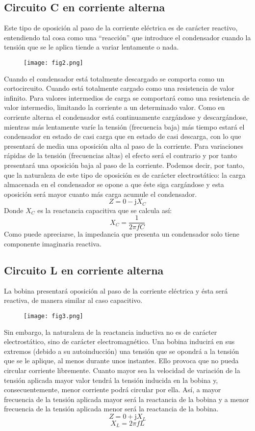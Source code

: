 \documentclass[a4paper,12pt]{report}
\begin{document}
\subsection{Circuito C en corriente alterna}
Este tipo de oposición al paso de la corriente eléctrica es de carácter reactivo, entendiendo tal cosa como una ``reacción''  que  introduce  el  condensador  cuando  la  tensión  que  se  le  aplica  tiende  a  variar  lentamente  o  nada. 
\begin{figure}[H]
\centering
\texttt{[image: fig2.png]}
\end{figure}
Cuando el condensador está totalmente descargado se comporta como un cortocircuito. Cuando está totalmente cargado  como  una  resistencia  de  valor  infinito.  Para  valores  intermedios  de  carga  se  comportará  como  una  resistencia  de  valor  intermedio,  limitando  la  corriente  a  un  determinado  valor.  Como  en  corriente  alterna  el  condensador  está  continuamente  cargándose  y  descargándose,  mientras  más  lentamente  varíe  la  tensión  (frecuencia baja) más tiempo estará el condensador en estado de casi carga que en estado de casi descarga, con lo que  presentará  de  media  una  oposición  alta  al  paso  de  la  corriente.  Para  variaciones  rápidas  de  la  tensión  (frecuencias  altas)  el  efecto  será  el  contrario  y  por  tanto  presentará  una  oposición  baja  al  paso  de  la  corriente.  Podemos  decir,  por  tanto,  que  la  naturaleza  de  este  tipo  de  oposición  es  de  carácter  electrostático:  la  carga  almacenada en el condensador se opone a que éste siga cargándose y esta oposición será mayor cuanto más carga acumule el condensador.
$$
Z = 0 - \mathrm{j}X_{C}
$$
Donde $X_{C}$ es la reactancia capacitiva que se calcula así:
$$
X_{C} = \frac{1}{2\pi f C}
$$
Como puede apreciarse, la impedancia que presenta un condensador solo tiene componente imaginaria reactiva.
\subsection{Circuito L en corriente alterna}
La  bobina  presentará  oposición  al  paso  de  la  corriente  eléctrica  y  ésta  será  reactiva,  de  manera  similar  al  caso  capacitivo.
\begin{figure}[H]
\centering
\texttt{[image: fig3.png]}
\end{figure}
Sin  embargo,  la  naturaleza  de  la  reactancia  inductiva  no  es  de  carácter  electrostático,  sino  de  carácter electromagnético. Una bobina inducirá en sus extremos (debido a su autoinducción) una tensión que se opondrá  a  la  tensión  que  se  le  aplique,  al  menos  durante  unos  instantes.  Ello  provoca  que  no  pueda  circular  corriente  libremente.  Cuanto  mayor  sea  la  velocidad  de  variación  de  la  tensión  aplicada  mayor  valor  tendrá  la  tensión  inducida  en  la  bobina  y,  consecuentemente,  menor  corriente  podrá  circular  por  ella.  Así,  a  mayor  frecuencia  de  la  tensión  aplicada  mayor  será  la  reactancia  de  la  bobina  y  a  menor  frecuencia  de  la  tensión  aplicada menor será la reactancia de la bobina.
$$
Z = 0 + \mathrm{j}X_{L}
$$
$$
X_{L} = 2\pi f L
$$
\end{document}
